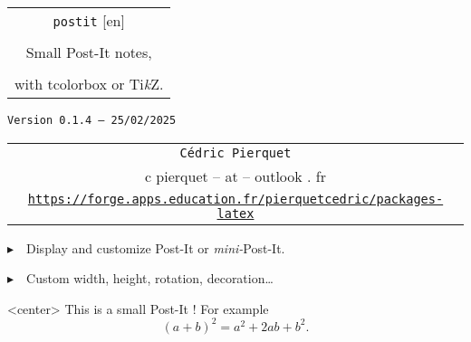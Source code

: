 \documentclass[english,a4paper,11pt]{article}
\def\TPversion{0.1.4}
\def\TPdate{25/02/2025}
\begin{document}
\setlength{\aweboxleftmargin}{0.07\linewidth}
\setlength{\aweboxcontentwidth}{0.93\linewidth}
\setlength{\aweboxvskip}{8pt}

\pagestyle{fancy}

\thispagestyle{empty}

\vspace{2cm}

\begin{center}
	\begin{minipage}{0.75\linewidth}
	\begin{tcolorbox}[colframe=yellow,colback=yellow!15]
		\begin{center}
			\begin{tabular}{c}
				{\Huge \texttt{postit} [en]}\\
				\\
				{\LARGE Small Post-It notes,} \\
				\\
				{\LARGE with \textsf{tcolorbox} or \textsf{Ti\textit{k}Z}.} \\
			\end{tabular}
			
			\bigskip
			
			{\small \texttt{Version \TPversion{} -- \TPdate}}
		\end{center}
	\end{tcolorbox}
\end{minipage}
\end{center}

\begin{center}
	\begin{tabular}{c}
	\texttt{Cédric Pierquet}\\
	{\ttfamily c pierquet -- at -- outlook . fr}\\
	\texttt{\url{https://forge.apps.education.fr/pierquetcedric/packages-latex}}
\end{tabular}
\end{center}

\vspace{0.25cm}

{$\blacktriangleright$~~Display and customize Post-It or \textit{mini-}Post-It.}

\vspace{0.25cm}

{$\blacktriangleright$~~Custom width, height, rotation, decoration\ldots}

\vspace{1cm}

\begin{PostItNote}[StorePostIt=PI1]<center>
	This is a small Post-It ! For example \[(a+b)^2=a^2+2ab+b^2.\]
\end{PostItNote}
\end{document}
